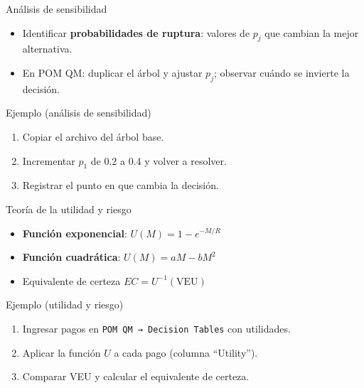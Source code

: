 \documentclass{beamer}
\begin{document}
\begin{frame}{Análisis de sensibilidad}
  \begin{itemize}
    \item Identificar \textbf{probabilidades de ruptura}:  
      valores de \(p_j\) que cambian la mejor alternativa.
    \item En POM QM:  
      duplicar el árbol y ajustar \(p_j\); observar cuándo se invierte la decisión.
  \end{itemize}
\end{frame}

\begin{frame}{Ejemplo (análisis de sensibilidad)}
  \begin{enumerate}\footnotesize
    \item Copiar el archivo del árbol base.
    \item Incrementar \(p_1\) de 0.2 a 0.4 y volver a resolver.
    \item Registrar el punto en que cambia la decisión.
  \end{enumerate}
\end{frame}

\begin{frame}{Teoría de la utilidad y riesgo}
  \small
  \begin{itemize}
    \item \textbf{Función exponencial}: \(U(M)=1-e^{-M/R}\)
    \item \textbf{Función cuadrática}: \(U(M)=aM-bM^{2}\)
    \item Equivalente de certeza \(EC=U^{-1}(\text{VEU})\)
  \end{itemize}
\end{frame}

\begin{frame}{Ejemplo (utilidad y riesgo)}
  \begin{enumerate}\footnotesize
    \item Ingresar pagos en \texttt{POM QM → Decision Tables} con utilidades.
    \item Aplicar la función \(U\) a cada pago (columna “Utility”).
    \item Comparar VEU y calcular el equivalente de certeza.
  \end{enumerate}
\end{frame}
\end{document}
